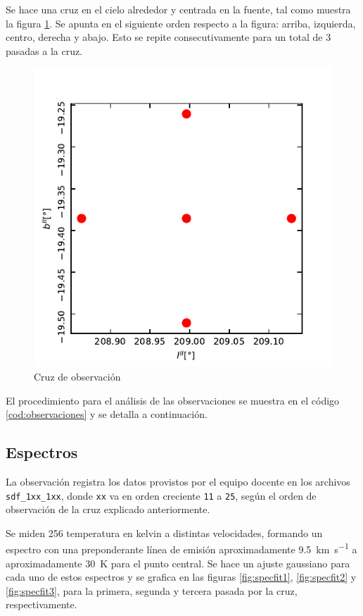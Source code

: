 Se hace una cruz en el cielo alrededor y centrada en la fuente, tal como muestra la figura \ref{fig:cruz}. Se apunta en el siguiente orden respecto a la figura: arriba, izquierda, centro, derecha y abajo. Esto se repite consecutivamente para un total de 3 pasadas a la cruz.

\begin{figure}[htbp]
	\centering
	\includegraphics{cruz.pdf}
	\caption{Cruz de observación}
	\label{fig:cruz}
\end{figure}

El procedimiento para el análisis de las observaciones se muestra en el código \ref{cod:observaciones} y se detalla a continuación.

\subsection{Espectros}

La observación registra los datos provistos por el equipo docente en los archivos \texttt{sdf\_1xx\_1xx}, donde \texttt{xx} va en orden creciente \texttt{11} a \texttt{25}, según el orden de observación de la cruz explicado anteriormente. 

Se miden 256 temperatura en kelvin a distintas velocidades, formando un espectro con una preponderante línea de emisión aproximadamente \SI{9.5}{\kilo\meter\per\second} a aproximadamente \SI{30}{\kelvin} para el punto central. Se hace un ajuste gaussiano para cada uno de estos espectros y se grafica en las figuras \ref{fig:specfit1}, \ref{fig:specfit2} y \ref{fig:specfit3}, para la primera, segunda y tercera pasada por la cruz, respectivamente.


